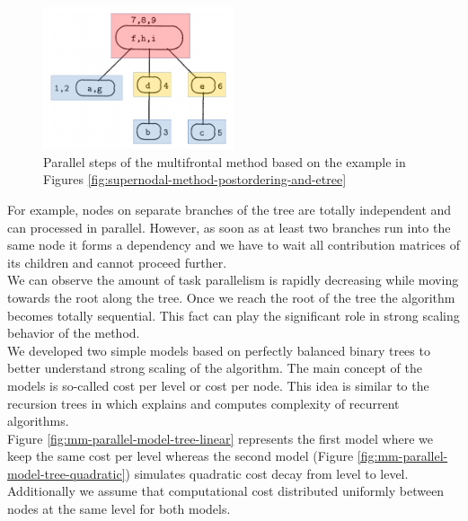 \figpointer{\ref{fig:elimination-tree-mm-parallel-steps}}

\begin{figure}[htpb]
  \centering
  \includegraphics[width=0.5\textwidth]{figures/chapter-2/elimination-tree-parallel.png}
\caption{Parallel steps of the multifrontal method based on the example in Figures \ref{fig:supernodal-method-postordering-and-etree}}
\label{fig:elimination-tree-mm-parallel-steps}
\end{figure}


For example, nodes on separate branches of the tree are totally independent and can processed in parallel. However, as soon as at least two branches run into the same node it forms a dependency and we have to wait all contribution matrices of its children and cannot proceed further.\\ 


We can observe the amount of task parallelism is rapidly decreasing while moving towards the root along the tree. Once we reach the root of the tree the algorithm becomes totally sequential. This fact can play the significant role in strong scaling behavior of the method.\\


We developed two simple models based on perfectly balanced binary trees to better understand strong scaling of the algorithm. The main concept of the models is so-called cost per level or cost per node. This idea is similar to the recursion trees in \cite{recursion-tree} which explains and computes complexity of recurrent algorithms.\\


Figure \ref{fig:mm-parallel-model-tree-linear} represents the first model where we keep the same cost per level whereas the second model (Figure \ref{fig:mm-parallel-model-tree-quadratic}) simulates quadratic cost decay from level to level. Additionally we assume that computational cost distributed uniformly between nodes at the same level for both models.\\


